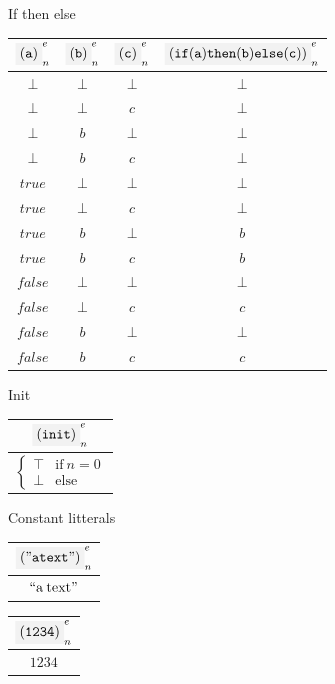 If then else

\begin{center}
\begin{tabular}{ccc|c}
  $\codemath{(a)}_n^e$ &$\codemath{(b)}_n^e$ & $\codemath{(c)}_n^e$  & $\codemath{(if(a)then(b)else(c))}_n^e$ \\
  \hline
$\bot$ &$\bot$ &$\bot$ &$\bot$ \\
$\bot$ &$\bot$ &$c$ &$\bot$ \\
$\bot$ &$b$ &$\bot$ &$\bot$ \\
$\bot$ &$b$ &$c$ &$\bot$ \\
$true$ &$\bot$ &$\bot$ &$\bot$ \\
$true$ &$\bot$ &$c$ &$\bot$ \\
$true$ &$b$ &$\bot$ &$b$ \\
$true$ &$b$ &$c$ &$b$ \\
$false$ &$\bot$ &$\bot$ &$\bot$ \\
$false$ &$\bot$ &$c$ &$c$ \\
$false$ &$b$ &$\bot$ &$\bot$ \\
$false$ &$b$ &$c$ &$c$ 
\end{tabular}
\end{center}

Init

\begin{center}
\begin{tabular}{|c}
 $\codemath{(init)}_n^e$ \\
  \hline
$\left\{
     \begin{array}{ll}
       \top & \mbox{if} \: n=0 \\
       \bot & \mbox{else}
     \end{array}
     \right. $
\end{tabular}
\end{center}

Constant litterals

\begin{center}
\begin{tabular}{|c}
  $\codemath{("a text")}_n^e$ \\
  \hline
  $\mathrm{``a \: text"}$
\end{tabular}
\end{center}

\begin{center}
\begin{tabular}{|c}
  $\codemath{(1234)}_n^e$ \\
  \hline
  $1234$
\end{tabular}
\end{center}

